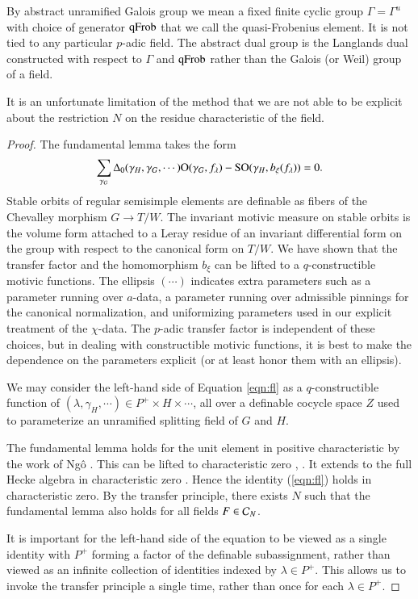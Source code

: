 By abstract unramified Galois group we mean a fixed finite cyclic group $\Gamma=\Gamma^u$ with choice of generator ${\operatorname{qFrob}}$
that we call the quasi-Frobenius element.  It is not tied to any particular $p$-adic field.   The abstract dual group is the Langlands
dual constructed with respect to $\Gamma$ and ${\operatorname{qFrob}}$ rather than the Galois (or Weil) group of a field.

It is an unfortunate limitation of the method that we are not able to be explicit about the restriction $N$ on the residue characteristic of the field.

\begin{proof}
The fundamental lemma takes the form
\begin{equation}\label{eqn:fl}
\sum_{\gamma_G}\Delta_0(\gamma_H,\gamma_G,\cdots){\operatorname{O}}(\gamma_G,f_\lambda) - {\operatorname{SO}}(\gamma_H,b_\xi(f_\lambda)) = 0.
\end{equation}
Stable orbits of regular semisimple elements are definable as fibers of the Chevalley morphism $G\to T/W$.  The invariant motivic measure
on stable orbits is the volume form attached to a Leray residue of an invariant differential form on the group with respect to the canonical
form on $T/W$.  We have shown that the transfer factor and the homomorphism $b_\xi$ can be lifted to a $q$-constructible motivic functions.
The ellipsis $(\cdots)$ indicates extra parameters such as a parameter running over $a$-data, a parameter running over admissible pinnings
for the canonical normalization, and uniformizing parameters used in our explicit treatment of the $\chi$-data.  The $p$-adic transfer factor is independent of these choices,
but in dealing with constructible motivic functions, it is best to make the dependence on the parameters explicit (or at least honor them with an ellipsis).

We may consider the left-hand side of Equation \ref{eqn:fl} as a $q$-constructible function of $(\lambda,\gamma_H,\cdots)\in P^+\times H\times\cdots$, all over a definable
cocycle space $Z$ used to parameterize an unramified splitting field of $G$ and $H$.  

The fundamental lemma holds for the unit element in positive characteristic by the work of Ng\^o \cite{ngo2010lemme}.
This can be lifted to characteristic zero \cite{cluckers2011transfer}, \cite{waldspurger2006endoscopie}.  
It extends to the full Hecke algebra in characteristic zero \cite{hales1995fundamental}.
Hence the identity (\ref{eqn:fl}) holds in characteristic zero.
By the transfer principle, 
there exists $N$ such that the fundamental lemma also holds for all fields $F\in\mathcal C_N$.

It is important for the left-hand side of the equation to be viewed as a 
single identity with $P^+$ forming a factor of the definable subassignment, rather than viewed as an infinite collection of identities indexed by $\lambda\in P^+$.
This allows us to invoke the transfer principle a single time, rather than once for each $\lambda\in P^+$.
\end{proof}

